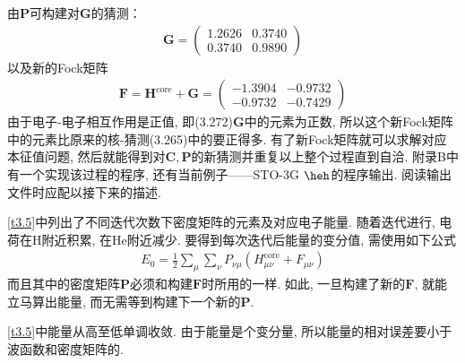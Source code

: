 由$\mathbf{P}$可构建对$\mathbf{G}$的猜测：
\begin{align}
	\mathbf{G}=\begin{pmatrix}
		1.2626&0.3740\\0.3740&0.9890
	\end{pmatrix}
\end{align}
以及新的Fock矩阵
\begin{align}
	\mathbf{F=H}^\mathrm{core}+\mathbf{G}=
	\begin{pmatrix}
		-1.3904&-0.9732 \\ -0.9732&-0.7429
	\end{pmatrix}
\end{align}
由于电子-电子相互作用是正值, 
即(3.272)$\mathbf{G}$中的元素为正数, 
所以这个新Fock矩阵中的元素比原来的核-\ha 猜测(3.265)中的要正得多. 
有了新Fock矩阵就可以求解对应本征值问题, 
然后就能得到对$\mathbf{C,P}$的新猜测并重复以上整个过程直到自洽. 
附录B中有一个实现该过程的程序, 
还有当前例子——STO-3G $\heh$的程序输出. 
阅读输出文件时应配以接下来的描述.


\autoref{t3.5}中列出了不同迭代次数下密度矩阵的元素及对应电子能量. 
随着迭代进行, 
电荷在$\mathrm{H}$附近积累, 
在$\mathrm{He}$附近减少. 
要得到每次迭代后能量的变分值, 
需使用如下公式
\begin{align}
	E_0 = \frac{1}{2}\sum_\mu\sum_\nu P_{\nu\mu}(H_{\mu\nu}^\mathrm{core}+F_{\mu\nu})
\end{align}
而且其中的密度矩阵$\mathbf{P}$必须和构建$\mathbf{F}$时所用的一样. 
如此, 
一旦构建了新的$\mathbf{F}$, 
就能立马算出能量, 
而无需等到构建下一个新的$\mathbf{P}$. 

\autoref{t3.5}中能量从高至低单调收敛. 由于能量是个变分量, 所以能量的相对误差要小于波函数和密度矩阵的. 

